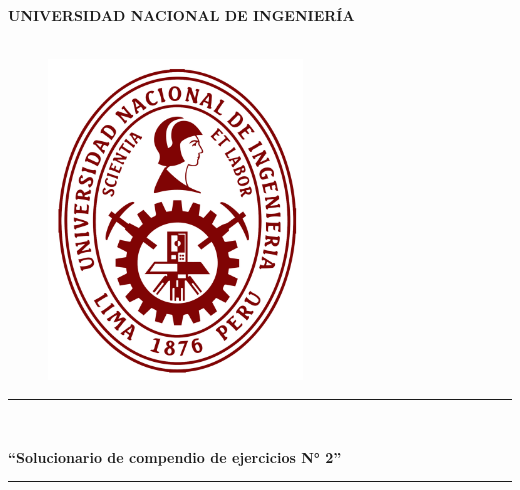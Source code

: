\begin{titlepage}
    \begin{center}
        {\LARGE \textbf{UNIVERSIDAD NACIONAL DE INGENIER\'IA}}\\
        \vspace{4mm}
        {\Large {}}\\
        \vspace{4mm}

        \begin{figure}[h]
            \centering
            \includegraphics[height=8.5cm]{assets/images/Logo UNI.png}     
        \end{figure}
        \textcolor{color_uni}{\rule{\linewidth}{0.40mm}}\\
        \begin{spacing}{1}
            \vspace{0.34cm}
            {\Large \textbf{``Solucionario de compendio de ejercicios N° 2''}}\\
        \end{spacing}
        \textcolor{color_uni}{\rule{\linewidth}{0.40mm}}\\
        \vspace{0.4cm}

    \end{center}


\end{titlepage}

